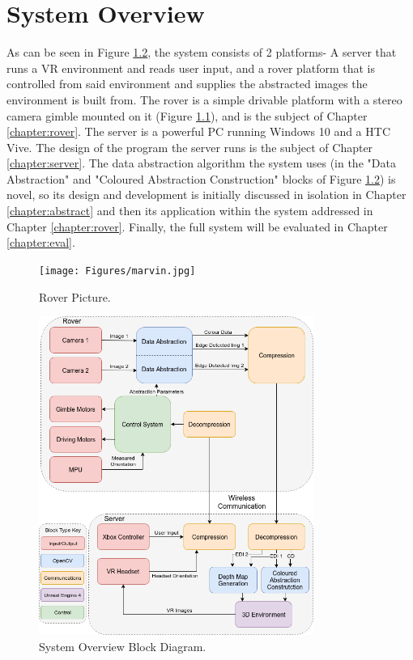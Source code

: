 \chapter{System Overview}
\label{chapter:system}

As can be seen in Figure \ref{fig:system}, the system consists of 2 platforms- A server that runs a VR environment and reads user input, and a rover platform that is controlled from said environment and supplies the abstracted images the environment is built from. The rover is a simple drivable platform with a stereo camera gimble mounted on it (Figure \ref{fig:marvin}), and is the subject of Chapter \ref{chapter:rover}. The server is a powerful PC running Windows 10 and a HTC Vive. The design of the program the server runs is the subject of Chapter \ref{chapter:server}. The data abstraction algorithm the system uses (in the "Data Abstraction" and "Coloured Abstraction Construction" blocks of Figure \ref{fig:system}) is novel, so its design and development is initially discussed in isolation in Chapter \ref{chapter:abstract} and then its application within the system addressed in Chapter \ref{chapter:rover}. Finally, the full system will be evaluated in Chapter \ref{chapter:eval}.

\begin{figure}[H]
    \begin{center}
      \texttt{[image: Figures/marvin.jpg]}
      \caption[Rover Picture]{Rover Picture.}
      \label{fig:marvin}
    \end{center}
\end{figure}

\begin{figure}[H]
    \begin{center}
      \includegraphics[width=0.8\textwidth]{Figures/System.png}
      \caption[System Overview Block Diagram]{System Overview Block Diagram.}
      \label{fig:system}
    \end{center}
\end{figure}